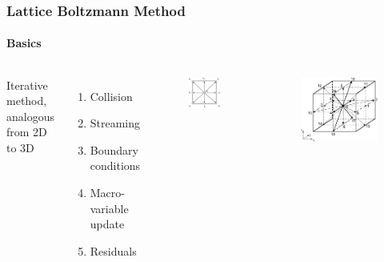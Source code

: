 \documentclass[xcolor=table]{beamer}
\begin{document}
	\begin{frame}
		\frametitle{Lattice Boltzmann Method}
		\framesubtitle{Basics}
		\begin{columns}
			Iterative method, analogous from 2D to 3D
			\begin{enumerate}
				\item Collision
				\item Streaming
				\item Boundary conditions
				\item Macro-variable update
				\item Residuals
			\end{enumerate}
			\centering
			\begin{figure}[t]
				\centering
			\includegraphics[scale=0.25]{Resources/d2q9.png}
			\end{figure}
			\begin{figure}[b]
				\centering
			\includegraphics[scale=0.15]{Resources/d3q19.png}
		\end{figure}
		\end{columns}
	\end{frame}
\end{document}
